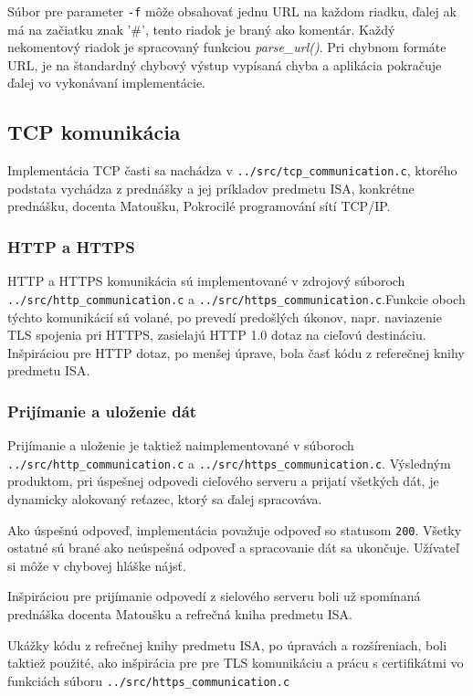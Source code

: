 Súbor pre parameter {\tt -f} môže obsahovať jednu URL na každom riadku, ďalej ak má na začiatku znak '\#', tento riadok je braný ako komentár. Každý nekomentový riadok je spracovaný funkciou {\it parse\_url()}. Pri chybnom formáte URL, je na štandardný chybový výstup vypísaná chyba a aplikácia pokračuje ďalej vo vykonávaní implementácie.

\subsection*{TCP komunikácia}
Implementácia TCP časti sa nachádza v {\tt ../src/tcp\_communication.c}, ktorého podstata vychádza z prednášky a jej príkladov predmetu ISA, konkrétne prednášku, docenta Matoušku, Pokrocilé programování sítí TCP/IP\cite{Matousek}. 

\subsubsection{HTTP a HTTPS}
HTTP a HTTPS komunikácia sú implementované v zdrojový súboroch 
\\{\tt ../src/http\_communication.c} a {\tt ../src/https\_communication.c}.Funkcie oboch týchto komunikácií sú volané, po prevedí predošlých úkonov, napr. naviazenie TLS spojenia pri HTTPS, zasielajú HTTP 1.0 dotaz na cieľovú destináciu. Inšpiráciou pre HTTP dotaz, po menšej úprave, bola časť kódu z referečnej knihy predmetu ISA\cite{Winkle}.
\subsubsection{Prijímanie a uloženie dát}
Prijímanie a uloženie je taktiež naimplementované v súboroch
\\{\tt ../src/http\_communication.c} a {\tt ../src/https\_communication.c}. Výsledným produktom, pri úspešnej odpovedi cieľového serveru a prijatí všetkých dát, je dynamicky alokovaný reťazec, ktorý sa ďalej spracováva.

Ako úspešnú odpoveď, implementácia považuje odpoveď so statusom {\tt 200}. Všetky ostatné\cite{ibmHttp} sú brané ako neúspešná odpoveď a spracovanie dát sa ukončuje. Užívateľ si môže v chybovej hláške nájsť.

Inšpiráciou pre prijímanie odpovedí z sielového serveru boli už spomínaná prednáška docenta Matoušku\cite{Matousek} a refrečná kniha predmetu ISA\cite{Winkle}.

Ukážky kódu z refrečnej knihy predmetu ISA\cite{Winkle}, po úpravách a rozšíreniach, boli taktiež použité, ako inšpirácia pre pre TLS komunikáciu a prácu s certifikátmi vo funkciách súboru {\tt ../src/https\_communication.c}

